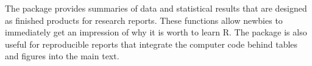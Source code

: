 The package  provides summaries of data and statistical
results that are designed as finished products for research
reports. These functions allow newbies to immediately get an
impression of why it is worth to learn R. The package is also useful
for reproducible reports that integrate the computer code behind
tables and figures into the main text.

